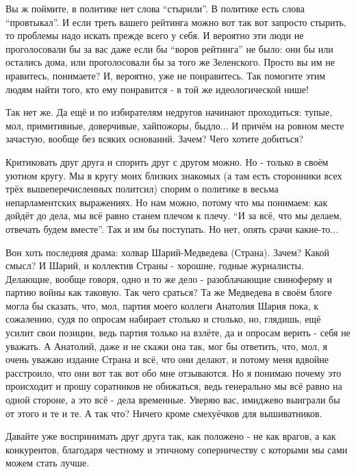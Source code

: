 Вы ж поймите, в политике нет слова \enquote{стырили}. В политике есть слова
\enquote{провтыкал}. И если треть вашего рейтинга можно вот так вот запросто стырить,
то проблемы надо искать прежде всего у себя. И вероятно эти люди не
проголосовали бы за вас даже если бы \enquote{воров рейтинга} не было: они бы или
остались дома, или проголосовали бы за того же Зеленского. Просто вы им не
нравитесь, понимаете? И, вероятно, уже не понравитесь.  Так помогите этим людям
найти того, кто ему понравится - в той же идеологической нише!

Так нет же. Да ещё и по избирателям недругов начинают проходиться: тупые, мол,
примитивные, доверчивые, хайпожоры, быдло... И причём на ровном месте зачастую,
вообще без всяких оснований. Зачем? Чего хотите добиться?

Критиковать друг друга и спорить друг с другом можно. Но - только в своём
уютном кругу. Мы в кругу моих близких знакомых (а там есть сторонники всех трёх
вышеперечисленных политсил) спорим о политике в весьма непарламентских
выражениях. Но нам можно, потому что мы понимаем: как дойдёт до дела, мы всё
равно станем плечом к плечу. \enquote{И за всё, что мы делаем, отвечать будем вместе}.
Так и им бы поступать. Но нет, опять срачи какие-то... 

Вон хоть последняя драма: холвар Шарий-Медведева (Страна). Зачем? Какой смысл?
И Шарий, и коллектив Страны - хорошие, годные журналисты. Делающие, вообще
говоря, одно и то же дело - разоблачающие свиноферму и партию войны как
таковую. Так чего сраться? Та же Медведева в своём блоге могла бы сказать, что,
мол, партия моего коллеги Анатолия Шария пока, к сожалению, судя по опросам
набирает столько и столько, но, глядишь, ещё усилит свои позиции, ведь партия
только на взлёте, да и опросам верить - себя не уважать. А Анатолий, даже и не
скажи она так, мог бы ответить, что, мол, я очень уважаю издание Страна и всё,
что они делают, и потому меня вдвойне расстроило, что они вот так вот обо мне
отзываются. Но я понимаю почему это происходит и прошу соратников не обижаться,
ведь генерально мы всё равно на одной стороне, а это всё - дела временные.
Уверяю вас, имиджево выиграли бы от этого и те и те. А так что? Ничего кроме
смехуёчков для вышиватников.

Давайте уже воспринимать друг друга так, как положено - не как врагов, а как
конкурентов, благодаря честному и этичному соперничеству с которыми мы сами
можем стать лучше.
